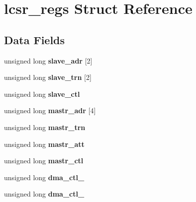 \hypertarget{structlcsr__regs}{}\section{lcsr\+\_\+regs Struct Reference}
\label{structlcsr__regs}
\subsection*{Data Fields}
\begin{DoxyCompactItemize}
\item 
\mbox{\label{structlcsr__regs_a3af5dbd35aaf5fe2acc0c78d22bcb855}} 
unsigned long {\bfseries slave\+\_\+adr} \mbox{[}2\mbox{]}
\item 
\mbox{\label{structlcsr__regs_a09d2d1f1584bbc84f794a8b33ce1bdf8}} 
unsigned long {\bfseries slave\+\_\+trn} \mbox{[}2\mbox{]}
\item 
\mbox{\label{structlcsr__regs_ab36ff493d66e4304e7827a9f3d516932}} 
unsigned long {\bfseries slave\+\_\+ctl}
\item 
\mbox{\label{structlcsr__regs_a14ba7bad35830847ff378829a4f042a4}} 
unsigned long {\bfseries mastr\+\_\+adr} \mbox{[}4\mbox{]}
\item 
\mbox{\label{structlcsr__regs_aa52026420926738b7975c73c346a4f3b}} 
unsigned long {\bfseries mastr\+\_\+trn}
\item 
\mbox{\label{structlcsr__regs_a72b09b4eae50a14e91a0251b484ded82}} 
unsigned long {\bfseries mastr\+\_\+att}
\item 
\mbox{\label{structlcsr__regs_ace3db211bd02a551097371a3530a0693}} 
unsigned long {\bfseries mastr\+\_\+ctl}
\item 
\mbox{\label{structlcsr__regs_a0a4db458631d5e23e89168c2aef1c497}} 
unsigned long {\bfseries dma\+\_\+ctl\+\_}
\item 
\mbox{\label{structlcsr__regs_afda8449ae342bbe7c1e0a5ce73c645cc}} 
unsigned long {\bfseries dma\+\_\+ctl\+\_}
\item 

\end{DoxyCompactItemize}
